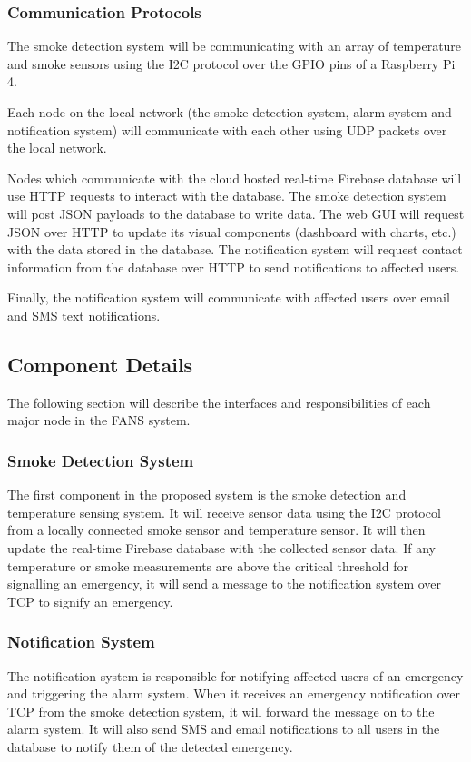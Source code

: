\subsubsection{Communication Protocols}

The smoke detection system will be communicating with an array of temperature and smoke sensors using the I2C protocol
over the GPIO pins of a Raspberry Pi 4.

Each node on the local network (the smoke detection system, alarm system and notification system) will communicate with
each other using UDP packets over the local network.

Nodes which communicate with the cloud hosted real-time Firebase database will use HTTP requests to interact with the
database. The smoke detection system will post JSON payloads to the database to write data. The web GUI will request
JSON over HTTP to update its visual components (dashboard with charts, etc.) with the data stored in the database. The
notification system will request contact information from the database over HTTP to send notifications to affected
users.

Finally, the notification system will communicate with affected users over email and SMS text notifications.

\subsection{Component Details}

The following section will describe the interfaces and responsibilities of each major node in the FANS system.

\subsubsection{Smoke Detection System}
The first component in the proposed system is the smoke detection and temperature sensing system. It will receive
sensor data using the I2C protocol from a locally connected smoke sensor and temperature sensor. It will then update
the real-time Firebase database with the collected sensor data. If any temperature or smoke measurements are above the
critical threshold for signalling an emergency, it will send a message to the notification system over TCP to signify
an emergency.

\subsubsection{Notification System}
The notification system is responsible for notifying affected users of an emergency and triggering the alarm system.
When it receives an emergency notification over TCP from the smoke detection system, it will forward the message on to
the alarm system. It will also send SMS and email notifications to all users in the database to notify them of the
detected emergency.

